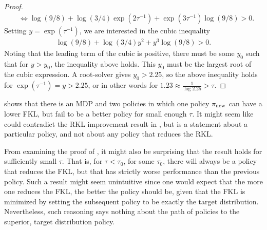 \documentclass[\main/thesis.tex]{subfiles}
\begin{document}
\begin{proof}
\begin{align*}
    &\iff \log(9/8) + \log(3/4)\exp(2 \tau^{-1}) + \exp(3\tau^{-1})\log(9/8) > 0.
\end{align*}
Setting $y = \exp(\tau^{-1})$, we are interested in the cubic inequality
\begin{align*}
    \log(9/8) + \log(3/4) y^2 + y^3\log(9/8) > 0.
\end{align*}
Noting that the leading term of the cubic is positive, there must be some $y_0$ such that for $y > y_0$, the inequality above holds. This $y_0$ must be the largest root of the cubic expression. A root-solver gives $y_0 > 2.25$, so the above inequality holds for $\exp(\tau^{-1}) = y > 2.25$, or in other words for $1.23 \approx \frac{1}{\log 2.25} > \tau$.

\end{proof}
%
 shows that there is an MDP and two policies in which one policy ${\pi_\mathrm{new}}$ can have a lower FKL, but fail to be a better policy for small enough $\tau$. It might seem like  could contradict the RKL improvement result in , but  is a statement about a particular policy, and not about any policy that reduces the RKL.

From examining the proof of , it might also be surprising that the result holds for sufficiently small $\tau$. That is, for $\tau < \tau_0$, for some $\tau_0$, there will always be a policy that reduces the FKL, but that has strictly worse performance than the previous policy. Such a result might seem unintuitive since one would expect that the more one reduces the FKL, the better the policy should be, given that the FKL is minimized by setting the subsequent policy to be exactly the target distribution. Nevertheless, such reasoning says nothing about the path of policies to the superior, target distribution policy. 
\end{document}
